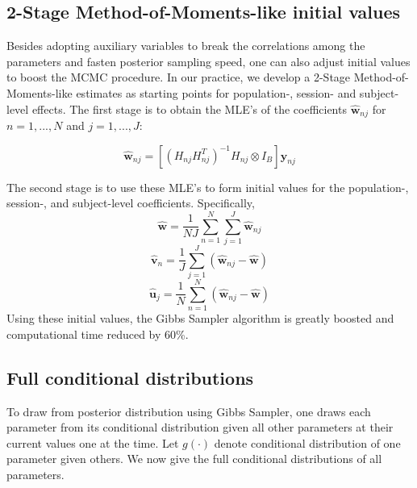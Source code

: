 \documentclass[12pt]{elsarticle}
\begin{document}
		
		
		\subsection{2-Stage Method-of-Moments-like initial values}
		Besides adopting auxiliary variables to break the correlations among the parameters and fasten posterior sampling speed, one can also adjust initial values to boost the MCMC procedure.
		In our practice, we develop a 2-Stage Method-of-Moments-like estimates as starting points for population-, session- and subject-level effects. 
		The first stage is to obtain the MLE's of the coefficients $\hat{\boldsymbol{w}}_{nj}$ for $n=1,...,N$ and $j=1,...,J$: 
		
		\begin{equation} \label{eq:25}
			\hat{\boldsymbol{w}}_{nj} = \left[ \left( H_{nj}H_{nj}^{T}\right)^{-1}H_{nj}\otimes I_{B} \right] \boldsymbol{y}_{nj}
		\end{equation}
		
		The second stage is to use these MLE's to form initial values for the population-, session-, and subject-level coefficients. 
		Specifically,
		\[\hat{\boldsymbol{w}} = \frac{1}{NJ} \sum_{n=1}^{N} \sum_{j=1}^{J} \hat{\boldsymbol{w}}_{nj}\]
		\[ \hat{\boldsymbol{v}}_{n} = \frac{1}{J} \sum_{j=1}^{J}(\hat{\boldsymbol{w}}_{nj}-\hat{\boldsymbol{w}})\]
		\[\hat{\boldsymbol{u}}_{j}=\frac{1}{N}\sum_{n=1}^{N}(\hat{\boldsymbol{w}}_{nj}-\hat{\boldsymbol{w}})\]
		Using these initial values, the Gibbs Sampler algorithm is greatly boosted and computational time reduced by 60\%. 
		
		
		
		
		
		
		\subsection{Full conditional distributions}
		To draw from posterior distribution using Gibbs Sampler, one draws each parameter from its conditional distribution given all other parameters at their current values one at the time. 
		Let $g(\cdot)$ denote conditional distribution of one parameter given others. 
		We now give the full conditional distributions of all parameters.
		
\end{document}
